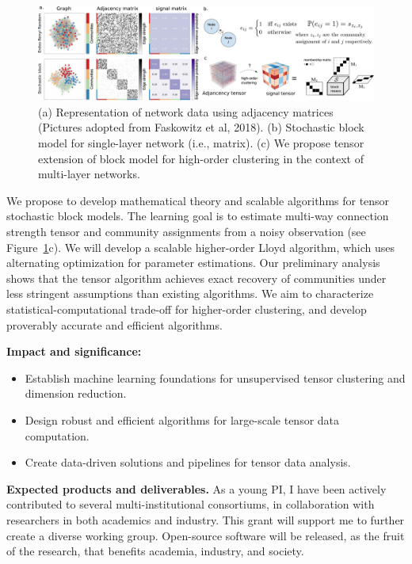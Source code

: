 \documentclass[11pt]{article}
\DeclareRobustCommand{\mybox}[2][gray!20]{%
\begin{tcolorbox}[   %
        breakable,
        left=0pt,
        right=0pt,
        top=0pt,
        bottom=0pt,
        colback=#1,
        colframe=#1,
        width=\dimexpr\textwidth\relax, 
        enlarge left by=0mm,
        boxsep=5pt,
        arc=0pt,outer arc=0pt,
        ]
        #2
\end{tcolorbox}
}
\theoremstyle{plain}
\theoremstyle{definition}
\begin{document}
\begin{figure}[H]
\vspace{-.2cm}
\begin{center}
\includegraphics[width=.9\textwidth]{network1.pdf}
\caption{(a) Representation of network data using adjacency matrices (Pictures adopted from Faskowitz et al, 2018). (b) Stochastic block model for single-layer network (i.e., matrix). (c) We propose tensor extension of block model for high-order clustering in the context of multi-layer networks.}\label{fig:1}
\end{center}
\vspace{-.6cm}
\end{figure}

We propose to develop mathematical theory and scalable algorithms for tensor stochastic block models. The learning goal is to estimate multi-way connection strength tensor and community assignments from a noisy observation (see Figure~\ref{fig:1}c). We will develop a scalable higher-order Lloyd algorithm, which uses alternating optimization for parameter estimations. Our preliminary analysis shows that the tensor algorithm achieves exact recovery of communities under less stringent assumptions than existing algorithms. We aim to characterize statistical-computational trade-off for higher-order clustering, and develop proverably accurate and efficient algorithms. 

\mybox[gray!20]{
{\bf Impact and significance:} 
\begin{itemize}[leftmargin=*]
\item Establish machine learning foundations for unsupervised tensor clustering and dimension reduction. 
\item Design robust and efficient algorithms for large-scale tensor data computation. 
\item Create data-driven solutions and pipelines for tensor data analysis.
\end{itemize}
 }
 
{\bf Expected products and deliverables.} As a young PI, I have been actively contributed to several multi-institutional consortiums, in collaboration with researchers in both academics and industry. This grant will support me to further create a diverse working group. Open-source software will be released, as the fruit of the research, that benefits academia, industry, and society.
\end{document}
